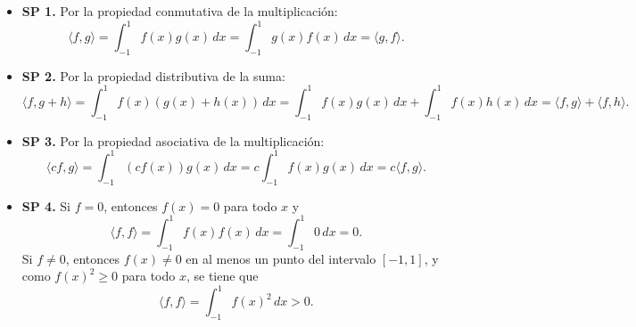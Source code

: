 \begin{itemize}
    \item \textbf{SP 1.} Por la propiedad conmutativa de la multiplicación:
    \[
        \langle f, g \rangle = \int_{-1}^{1} f(x)g(x) \, dx = \int_{-1}^{1} g(x)f(x) \, dx = \langle g, f \rangle.
    \]

    \item \textbf{SP 2.} Por la propiedad distributiva de la suma:
    \[
        \langle f, g + h \rangle = \int_{-1}^{1} f(x)(g(x) + h(x)) \, dx = \int_{-1}^{1} f(x)g(x) \, dx + \int_{-1}^{1} f(x)h(x) \, dx = \langle f, g \rangle + \langle f, h \rangle.
    \]

    \item \textbf{SP 3.} Por la propiedad asociativa de la multiplicación:
    \[
        \langle cf, g \rangle = \int_{-1}^{1} (cf(x))g(x) \, dx = c \int_{-1}^{1} f(x)g(x) \, dx = c \langle f, g \rangle.
    \]

    \item \textbf{SP 4.} Si $f = 0$, entonces $f(x) = 0$ para todo $x$ y
    \[
        \langle f, f \rangle = \int_{-1}^{1} f(x)f(x) \, dx = \int_{-1}^{1} 0 \, dx = 0.
    \]
    Si $f \neq 0$, entonces $f(x) \neq 0$ en al menos un punto del intervalo $[-1, 1]$, y como $f(x)^2 \geq 0$ para todo $x$, se tiene que
    \[
        \langle f, f \rangle = \int_{-1}^{1} f(x)^2 \, dx > 0.
    \]
\end{itemize}